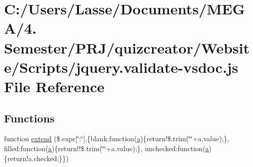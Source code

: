 \hypertarget{jquery_8validate-vsdoc_8js}{}\section{C\+:/\+Users/\+Lasse/\+Documents/\+M\+E\+G\+A/4. Semester/\+P\+R\+J/quizcreator/\+Website/\+Scripts/jquery.validate-\/vsdoc.js File Reference}
\label{jquery_8validate-vsdoc_8js}
\subsection*{Functions}
\begin{DoxyCompactItemize}
\item 
function \hyperlink{jquery_8validate-vsdoc_8js_a08553879d4a764e75170d547d37bd35f}{extend} (\$.expr\mbox{[}\char`\"{}\+:\char`\"{}\mbox{]},\{blank\+:function(\hyperlink{jquery_8unobtrusive-ajax_8min_8js_a9cf3d65797f4cbe9deaab01492290370}{a})\{return!\$.\+trim(\char`\"{}\char`\"{}+a.\+value);\}, filled\+:function(\hyperlink{jquery_8unobtrusive-ajax_8min_8js_a9cf3d65797f4cbe9deaab01492290370}{a})\{return!!\$.\+trim(\char`\"{}\char`\"{}+a.\+value);\}, unchecked\+:function(\hyperlink{jquery_8unobtrusive-ajax_8min_8js_a9cf3d65797f4cbe9deaab01492290370}{a})\{return!a.\+checked;\}\})
\item 

\end{DoxyCompactItemize}
